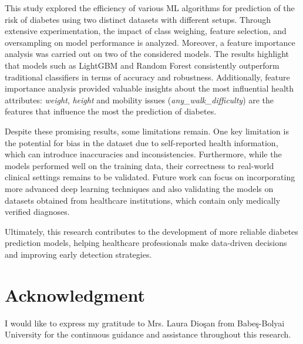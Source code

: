 \documentclass[runningheads]{llncs}
\begin{document}
This study explored the efficiency of various ML algorithms for prediction of the risk of diabetes using two distinct datasets with different setups. Through extensive experimentation, the impact of class weighing, feature selection, and oversampling on model performance is analyzed. Moreover, a feature importance analysis was carried out on two of the considered models. The results highlight that models such as LightGBM and Random Forest consistently outperform traditional classifiers in terms of accuracy and robustness. Additionally, feature importance analysis provided valuable insights about the most influential health attributes: \textit{weight}, \textit{height} and mobility issues (\textit{any\_walk\_difficulty}) are the features that influence the most the prediction of diabetes.

Despite these promising results, some limitations remain. One key limitation is the potential for bias in the dataset due to self-reported health information, which can introduce inaccuracies and inconsistencies. Furthermore, while the models performed well on the training data, their correctness to real-world clinical settings remains to be validated.  Future work can focus on incorporating more advanced deep learning techniques and also validating the models on datasets obtained from healthcare institutions, which contain only medically verified diagnoses. 


 Ultimately, this research contributes to the development of more reliable diabetes prediction models, helping healthcare professionals make data-driven decisions and improving early detection strategies.


\section{Acknowledgment}
\label{section:ack}

I would like to express my gratitude to Mrs. Laura Dio\c{s}an from Babe\c{s}-Bolyai University for the continuous guidance and assistance throughout this research.

 
 
\end{document}
